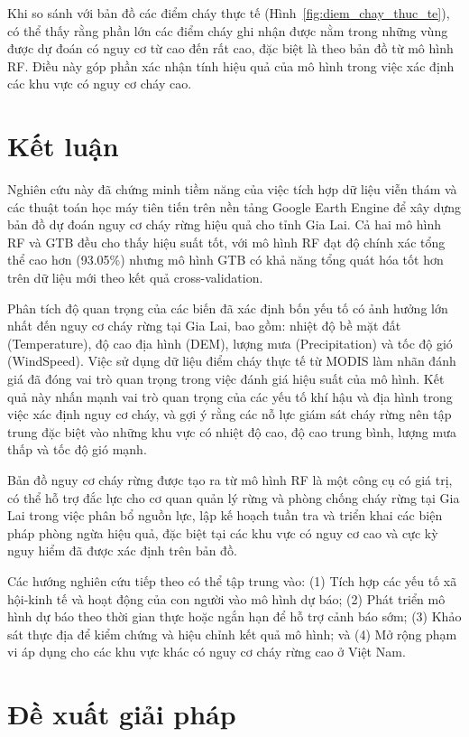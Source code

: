 \documentclass{article}
\begin{document}
Khi so sánh với bản đồ các điểm cháy thực tế (Hình~\ref{fig:diem_chay_thuc_te}), có thể thấy rằng phần lớn các điểm cháy ghi nhận được nằm trong những vùng được dự đoán có nguy cơ từ cao đến rất cao, đặc biệt là theo bản đồ từ mô hình RF. Điều này góp phần xác nhận tính hiệu quả của mô hình trong việc xác định các khu vực có nguy cơ cháy cao.

\section{Kết luận} %
Nghiên cứu này đã chứng minh tiềm năng của việc tích hợp dữ liệu viễn thám và các thuật toán học máy tiên tiến trên nền tảng Google Earth Engine để xây dựng bản đồ dự đoán nguy cơ cháy rừng hiệu quả cho tỉnh Gia Lai. Cả hai mô hình RF và GTB đều cho thấy hiệu suất tốt, với mô hình RF đạt độ chính xác tổng thể cao hơn (93.05\%) nhưng mô hình GTB có khả năng tổng quát hóa tốt hơn trên dữ liệu mới theo kết quả cross-validation.

Phân tích độ quan trọng của các biến đã xác định bốn yếu tố có ảnh hưởng lớn nhất đến nguy cơ cháy rừng tại Gia Lai, bao gồm: nhiệt độ bề mặt đất (Temperature), độ cao địa hình (DEM), lượng mưa (Precipitation) và tốc độ gió (WindSpeed). Việc sử dụng dữ liệu điểm cháy thực tế từ MODIS làm nhãn đánh giá đã đóng vai trò quan trọng trong việc đánh giá hiệu suất của mô hình. Kết quả này nhấn mạnh vai trò quan trọng của các yếu tố khí hậu và địa hình trong việc xác định nguy cơ cháy, và gợi ý rằng các nỗ lực giám sát cháy rừng nên tập trung đặc biệt vào những khu vực có nhiệt độ cao, độ cao trung bình, lượng mưa thấp và tốc độ gió mạnh.

Bản đồ nguy cơ cháy rừng được tạo ra từ mô hình RF là một công cụ có giá trị, có thể hỗ trợ đắc lực cho cơ quan quản lý rừng và phòng chống cháy rừng tại Gia Lai trong việc phân bổ nguồn lực, lập kế hoạch tuần tra và triển khai các biện pháp phòng ngừa hiệu quả, đặc biệt tại các khu vực có nguy cơ cao và cực kỳ nguy hiểm đã được xác định trên bản đồ.

Các hướng nghiên cứu tiếp theo có thể tập trung vào: (1) Tích hợp các yếu tố xã hội-kinh tế và hoạt động của con người vào mô hình dự báo; (2) Phát triển mô hình dự báo theo thời gian thực hoặc ngắn hạn để hỗ trợ cảnh báo sớm; (3) Khảo sát thực địa để kiểm chứng và hiệu chỉnh kết quả mô hình; và (4) Mở rộng phạm vi áp dụng cho các khu vực khác có nguy cơ cháy rừng cao ở Việt Nam.

\section{Đề xuất giải pháp}
\end{document}
